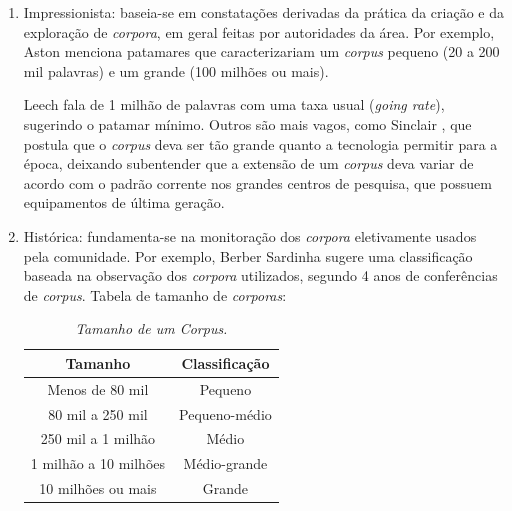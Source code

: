 \begin{enumerate}
\item Impressionista: baseia-se em constatações derivadas da prática da criação e da exploração de \emph{corpora}, em geral feitas por autoridades da área. Por exemplo, Aston \cite{aston97} menciona patamares que caracterizariam um \emph{corpus} pequeno (20 a 200 mil palavras) e um grande (100 milhões ou mais).

Leech \cite{leech91} fala de 1 milhão de palavras com uma taxa usual (\emph{going rate}), sugerindo o patamar mínimo. Outros são mais vagos, como Sinclair \cite{sinclair97}, que postula que o \emph{corpus} deva ser tão grande quanto a tecnologia permitir para a época, deixando subentender que a extensão de um \emph{corpus} deva variar de acordo com o padrão corrente nos grandes centros de pesquisa, que possuem equipamentos de última geração.

\item Histórica: fundamenta-se na monitoração dos \emph{corpora} eletivamente usados pela comunidade. Por exemplo, Berber Sardinha \cite{sardinha04} sugere uma classificação baseada na observação dos \emph{corpora} utilizados, segundo 4 anos de conferências de \emph{corpus}. Tabela de tamanho de \emph{corporas}:
\\




\begin{table}
   \centering
   \small
   \caption{\it Tamanho de um Corpus.}

   \begin{tabular}{| c | c |}
      \hline
        \textbf{Tamanho} & \textbf{Classificação}\\
        \hline
        \hline
        Menos de 80 mil & Pequeno\\
        \hline
        80 mil a 250 mil & Pequeno-médio\\
        \hline
        250 mil a 1 milhão & Médio\\
        \hline
        1 milhão a 10 milhões & Médio-grande\\
        \hline
        10 milhões ou mais & Grande\\
        \hline

   \end{tabular}

\end{table}






\end{enumerate}
